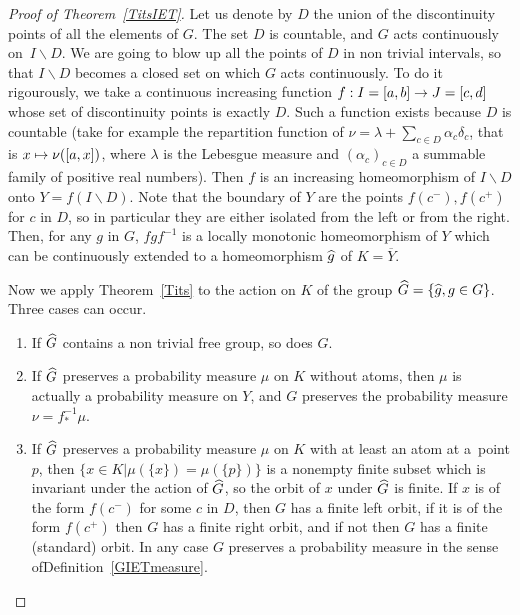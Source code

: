 \documentclass[AHL,Unicode,longabstracts,published]{cedram}
\newcounter{setofcase}
\newcounter{case}[setofcase]
\let\oldmapsto\mapsto
\renewcommand*{\mapsto}{\mathchoice{\longmapsto}{\oldmapsto}{\oldmapsto}{\oldmapsto}}
\renewcommand*{\to}{\mathchoice{\longrightarrow}{\rightarrow}{\rightarrow}{\rightarrow}}
\let\oldhat\hat
\renewcommand*{\hat}[1]{\mathchoice{\widehat{#1}}{\widehat{#1}}{\oldhat{#1}}{\oldhat{#1}}}
\begin{document}
\begin{proof}[Proof of Theorem~\ref{TitsIET}]
Let us denote by $D$ the union of the discontinuity points of all the elements of $G$. The set $D$ is countable, and $G$ acts continuously on~$I\backslash D$. We are going to blow up all the points of $D$ in non trivial intervals, so that $I\backslash D$ becomes a closed set on which $G$ acts continuously. To do it rigourously, we take a continuous increasing function $f:I=[a,b]\to J=[c,d]$ whose set of discontinuity points is exactly $D$. Such a function exists because $D$ is countable (take for example the repartition function of $\nu=\lambda+\sum_{c\in D} \alpha_c \delta_c$, that is $x \mapsto \nu([a,x])$, where $\lambda$ is the Lebesgue measure and $(\alpha_c)_{c\in D}$ a summable family of positive real numbers). Then $f$ is an increasing homeomorphism of $I\backslash D$ onto $Y=f(I\backslash D)$. Note that the boundary of $Y$ are the points $f(c^-),f(c^+)$ for $c$ in $D$, so in particular they are either isolated from the left or from the right. Then, for any $g$ in $G$, $fgf^{-1}$ is a locally monotonic homeomorphism of $Y$ which can be continuously extended to a homeomorphism $\hat{g}$ of $K=\overline{Y}$.

\pagebreak{}
Now we apply Theorem~\ref{Tits} to the action on $K$ of the group $\hat{G}=\{\hat{g},g\in G\}$. Three cases can occur.
\begin{enumerate}
\item If $\hat{G}$ contains a non trivial free group, so does $G$.
\item If $\hat{G}$ preserves a probability measure $\mu$ on $K$ without atoms, then $\mu$ is actually a probability measure on $Y$, and $G$ preserves the probability measure ${\nu=f^{-1}_*\mu}$.
\item If $\hat{G}$ preserves a probability measure $\mu$ on $K$ with at least an atom at a~point $p$, then $\{x\in K| \mu(\{x\})=\mu(\{p\})\}$ is a nonempty finite subset which is invariant under the action of $\hat{G}$, so the orbit of $x$ under $\hat{G}$ is finite. If $x$ is of the form $f(c^-)$ for some $c$ in $D$, then $G$ has a finite left orbit, if it is of the form $f(c^+)$ then $G$ has a finite right orbit, and if not then $G$ has a finite (standard) orbit. In any case $G$ preserves a probability measure in the sense of\linebreak Definition~\ref{GIETmeasure}.\qedhere
\end{enumerate}\let\qed\relax
\end{proof}
\end{document}
